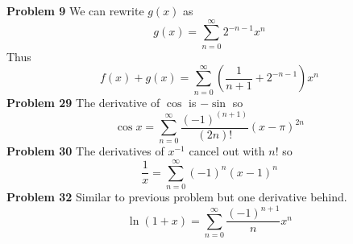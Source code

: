 \textbf{Problem 9}
We can rewrite $g(x)$ as 
\[
    g(x) = \sum_{n=0}^\infty 2^{-n-1}x^n
\]
Thus 
\[
    f(x) + g(x) = \sum_{n=0}^\infty \left(\frac{1}{n+1} + 2^{-n-1}\right)x^n
\]
\textbf{Problem 29}
The derivative of $\cos$ is $-\sin$ so 
\[
    \cos x = \sum_{n=0}^\infty \frac{(-1)^(n+1)}{(2n)!}(x-\pi)^{2n}
\]
\textbf{Problem 30}
The derivatives of $x^{-1}$ cancel out with $n!$ so
\[
    \frac{1}{x} = \sum_{n=0}^\infty (-1)^n(x-1)^n
\]
\textbf{Problem 32}
Similar to previous problem but one derivative behind.
\[
    \ln(1+x) = \sum_{n=0}^\infty \frac{(-1)^{n+1}}{n}x^n
\]